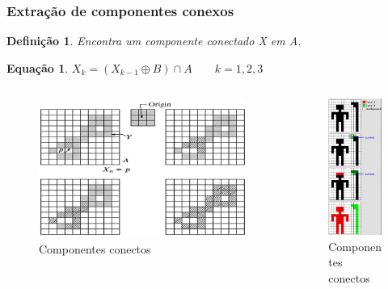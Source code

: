 \documentclass[aspectratio=169]{beamer}
\theoremstyle{Definition}
\newtheorem{defn}{Defini\c c\~ao}
\newtheorem{eq}[theorem]{Equa\c c\~ao}
\begin{document}
\begin{frame}
	\frametitle{Extração de componentes conexos}
	
	\begin{defn}
    	Encontra um componente conectado X em A.
	\end{defn}
	
	\begin{eq}
    	$ X_k = ( X_{k-1} \oplus B) \cap A \qquad k = 1, 2, 3$   
	\end{eq}
	
	\begin{columns}
		\begin{column}{0.5\textwidth}
			\begin{figure}[h]
	  		 	\includegraphics[height=0.3\paperheight]{imagens/conecteds}
				\caption{Componentes conectos}\label{figConecteds1}
			\end{figure}
		\end{column}
		\begin{column}{0.5\textwidth}
			\begin{figure}[h]
			   	\includegraphics[width=4cm, height=0.3\paperheight]{imagens/conecteds2}
				\caption{Componentes conectos}\label{figConecteds2}
			\end{figure}
		\end{column}
	\end{columns}
	
\end{frame}
\end{document}
